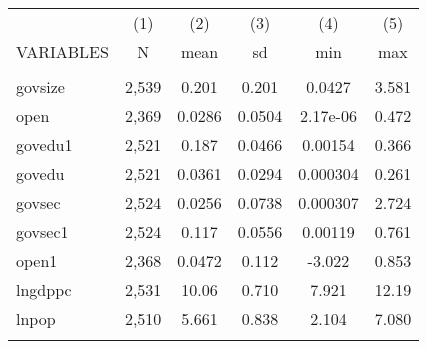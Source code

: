 \documentclass[]{article}
\begin{document}
\begin{tabular}{lccccc} \hline
 & (1) & (2) & (3) & (4) & (5) \\
VARIABLES & N & mean & sd & min & max \\ \hline
 &  &  &  &  &  \\
govsize & 2,539 & 0.201 & 0.201 & 0.0427 & 3.581 \\
open & 2,369 & 0.0286 & 0.0504 & 2.17e-06 & 0.472 \\
govedu1 & 2,521 & 0.187 & 0.0466 & 0.00154 & 0.366 \\
govedu & 2,521 & 0.0361 & 0.0294 & 0.000304 & 0.261 \\
govsec & 2,524 & 0.0256 & 0.0738 & 0.000307 & 2.724 \\
govsec1 & 2,524 & 0.117 & 0.0556 & 0.00119 & 0.761 \\
open1 & 2,368 & 0.0472 & 0.112 & -3.022 & 0.853 \\
lngdppc & 2,531 & 10.06 & 0.710 & 7.921 & 12.19 \\
lnpop & 2,510 & 5.661 & 0.838 & 2.104 & 7.080 \\
 &  &  &  &  &  \\ \hline
\end{tabular}
\end{document}
